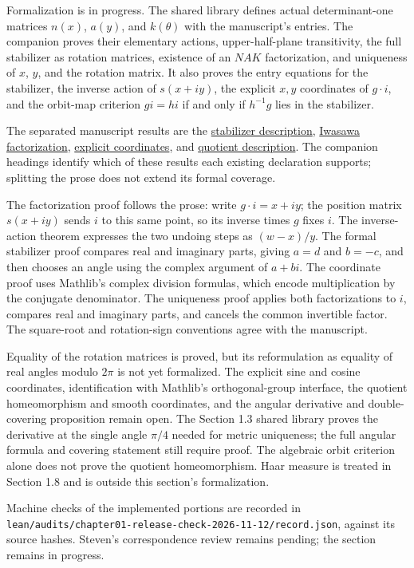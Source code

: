 Formalization is in progress. The shared library defines actual determinant-one matrices $n(x)$, $a(y)$, and $k(\theta)$ with the manuscript's entries. The companion proves their elementary actions, upper-half-plane transitivity, the full stabilizer as rotation matrices, existence of an $NAK$ factorization, and uniqueness of $x$, $y$, and the rotation matrix. It also proves the entry equations for the stabilizer, the inverse action of $s(x+iy)$, the explicit $x,y$ coordinates of $g\cdot i$, and the orbit-map criterion $gi=hi$ if and only if $h^{-1}g$ lies in the stabilizer.

The separated manuscript results are the \hyperref[hyperbolic.stabilizer]{stabilizer description}, \hyperref[hyperbolic.iwasawa]{Iwasawa factorization}, \hyperref[hyperbolic.iwasawa-explicit-coordinates]{explicit coordinates}, and \hyperref[hyperbolic.quotient-description]{quotient description}. The companion headings identify which of these results each existing declaration supports; splitting the prose does not extend its formal coverage.

The factorization proof follows the prose: write $g\cdot i=x+iy$; the position matrix $s(x+iy)$ sends $i$ to this same point, so its inverse times $g$ fixes $i$. The inverse-action theorem expresses the two undoing steps as $(w-x)/y$. The formal stabilizer proof compares real and imaginary parts, giving $a=d$ and $b=-c$, and then chooses an angle using the complex argument of $a+bi$. The coordinate proof uses Mathlib's complex division formulas, which encode multiplication by the conjugate denominator. The uniqueness proof applies both factorizations to $i$, compares real and imaginary parts, and cancels the common invertible factor. The square-root and rotation-sign conventions agree with the manuscript.

Equality of the rotation matrices is proved, but its reformulation as equality of real angles modulo $2\pi$ is not yet formalized. The explicit sine and cosine coordinates, identification with Mathlib's orthogonal-group interface, the quotient homeomorphism and smooth coordinates, and the angular derivative and double-covering proposition remain open. The Section 1.3 shared library proves the derivative at the single angle $\pi/4$ needed for metric uniqueness; the full angular formula and covering statement still require proof. The algebraic orbit criterion alone does not prove the quotient homeomorphism. Haar measure is treated in Section 1.8 and is outside this section's formalization.

Machine checks of the implemented portions are recorded in \texttt{lean/audits/chapter01-release-check-2026-11-12/record.json}, against its source hashes. Steven's correspondence review remains pending; the section remains in progress.
